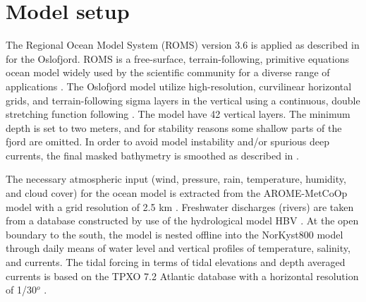 \section{Model setup}

The Regional Ocean Model System (ROMS) version 3.6 is applied as described in \cite{roed16} for the Oslofjord. ROMS is a free-surface, terrain-following, primitive equations ocean model widely used by the scientific community for a diverse range of applications \cite[]{shchepetkin05,shchepetkin09,haidvogel08}. 
The Oslofjord model utilize high-resolution, curvilinear horizontal grids, and terrain-following sigma layers in the vertical using a continuous, double stretching function following \cite{shchepetkin09}. The model have 42 vertical layers. The minimum depth is set to two meters, and for stability reasons some shallow parts of the fjord are omitted. In order to avoid model instability and/or spurious deep currents, the final masked bathymetry is smoothed as described in \cite{roed16}.



The necessary atmospheric input (wind, pressure, rain, temperature, humidity, and cloud cover) for the ocean model is extracted from the AROME-MetCoOp model with a grid resolution of 2.5 km \cite[]{muller2015}. Freshwater discharges (rivers) are taken from a database constructed by use of the hydrological model HBV \cite[]{beldring2003}. At the open boundary to the south, the model is nested offline into the NorKyst800 model \cite[]{albretsen11} through daily means of water level and vertical profiles of temperature, salinity, and currents.  
The tidal forcing in terms of tidal elevations and depth averaged currents is based on the TPXO 7.2 Atlantic database with a horizontal resolution of 1/30$^o$ \cite[]{egbert02}.


